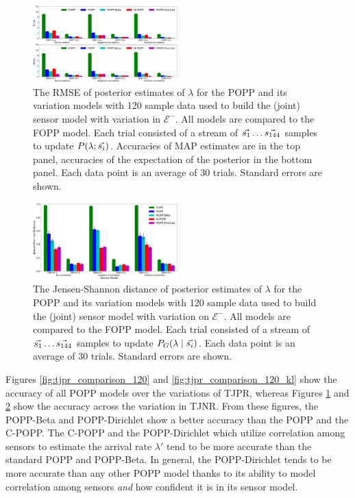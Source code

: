 \begin{figure}[t!]
	\centering
	\includegraphics[width=0.5\textwidth]{./figures/tjnr_comparison_120.png}
    \caption{The RMSE of posterior estimates of $\lambda$ for the POPP and its variation models with 120 sample data used to build the (joint) sensor model with variation in $\mathcal{E^-}$. All models are compared to the FOPP model. Each trial consisted of a stream of $\protect\vec{s_1} \ldots \protect\vec{s_{144}}$ samples to update $P(\lambda ; \protect\vec{s_i})$. Accuracies of MAP estimates are  in the top panel, accuracies of the expectation of the posterior in the bottom panel. Each data point is an average of 30 trials. Standard errors are shown.} 
	\label{fig:tjnr_comparison_120}
\end{figure}

\begin{figure}[t!]
	\centering
	\includegraphics[width=0.5\textwidth]{./figures/tjnr_comparison_120_kl.png}
	\caption{The Jensen-Shannon distance of posterior estimates of $\lambda$ for the POPP and its variation models with 120 sample data used to build the (joint) sensor model with variation on $\mathcal{E^-}$. All models are compared to the FOPP model. Each trial consisted of a stream of $\protect\vec{s_1} \ldots \protect\vec{s_{144}}$ samples to update $P_G(\lambda \mid \protect\vec{s_i})$. Each data point is an average of 30 trials. Standard errors are shown.} 
	\label{fig:tjnr_comparison_120_kl}
\end{figure}

Figures \ref{fig:tjpr_comparison_120} and \ref{fig:tjpr_comparison_120_kl} show the accuracy of all POPP models over the variations of TJPR, whereas Figures \ref{fig:tjnr_comparison_120} and \ref{fig:tjnr_comparison_120_kl} show the accuracy across the variation in TJNR. From these figures, the POPP-Beta and POPP-Dirichlet show a better accuracy than the POPP and the C-POPP. The C-POPP and the POPP-Dirichlet which utilize correlation among sensors to estimate the arrival rate $\lambda'$ tend to be more accurate than the standard POPP and POPP-Beta.
In general, the POPP-Dirichlet tends to be more accurate than any other POPP model thanks to its ability to model correlation among sensors \emph{and} how confident it is in its sensor model.
